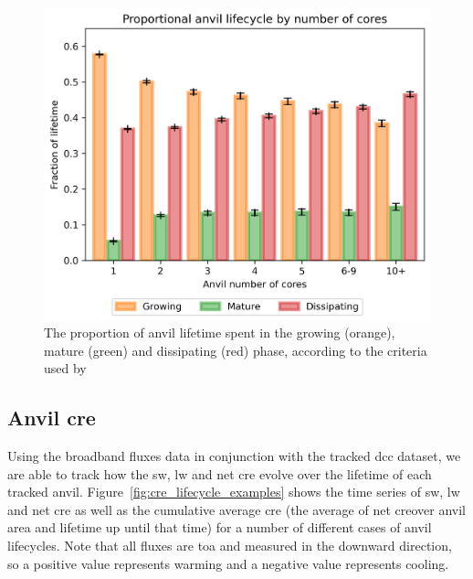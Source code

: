 \begin{figure}[tp]
    \includegraphics[width=\textwidth]{figures/ch3_09.png}
    \caption[
    The proportion of anvil lifetime spent in the growing, mature and dissipating phase
    ]{
    The proportion of anvil lifetime spent in the growing (orange), mature (green) and dissipating (red) phase, according to the criteria used by \citet{futyan_deep_2007}
    }
    \label{fig:seviri_lifetime_proportions}
\end{figure}


\subsection{Anvil \acrshort{cre}}

Using the broadband fluxes data in conjunction with the tracked \acrshort{dcc} dataset, we are able to track how the \acrshort{sw}, \acrshort{lw} and net \acrshort{cre} evolve over the lifetime of each tracked anvil. 
Figure~\ref{fig:cre_lifecycle_examples} shows the time series of \acrshort{sw}, \acrshort{lw} and net \acrshort{cre} as well as the cumulative average \acrshort{cre} (the average of net \acrshort{cre}over anvil area and lifetime up until that time) for a number of different cases of anvil lifecycles. 
Note that all fluxes are \acrshort{toa} and measured in the downward direction, so a positive value represents warming and a negative value represents cooling.


